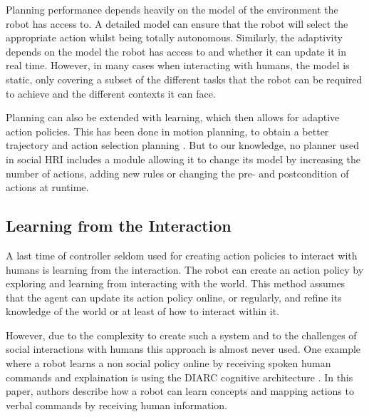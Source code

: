     Planning performance depends heavily on the model of the environment the robot has access to. A detailed model can ensure that the robot will select the appropriate action whilst being totally autonomous. Similarly, the adaptivity depends on the model the robot has access to and whether it can update it in real time. However, in many cases when interacting with humans, the model is static, only covering a subset of the different tasks that the robot can be required to achieve and the different contexts it can face.
    
    
    
    Planning can also be extended with learning, which then allows for adaptive action policies. This has been done in motion planning, to obtain a better trajectory \citep{jain2013learning,beetz2004rpllearn} and action selection planning \citep{kirsch2009robot}. But to our knowledge, no planner used in social HRI includes a module allowing it to change its model by increasing the number of actions, adding new rules or changing the pre- and postcondition of actions at runtime.

\subsection{Learning from the Interaction}

	A last time of controller seldom used for creating action policies to interact with humans is learning from the interaction. The robot can create an action policy by exploring and learning from interacting with the world. This method assumes that the agent can update its action policy online, or regularly, and refine its knowledge of the world or at least of how to interact within it. 
	
	However, due to the complexity to create such a system and to the challenges of social interactions with humans this approach is almost never used. One example where a robot learns a non social policy online by receiving spoken human commands and explaination is using the DIARC cognitive architecture \cite{scheutz2017spoken}. In this paper, authors describe how a robot can learn concepts and mapping actions to verbal commands by receiving human information.


